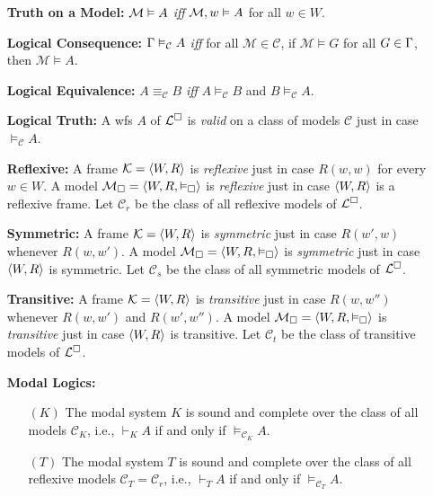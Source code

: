 \documentclass[a4paper, 11pt]{article} %
\begin{document}
\begin{enumerate}[leftmargin=1.2in] %
	\item[\bf Truth on a Model:] $\mathcal{M}\vDash A$ \textit{iff} $\mathcal{M},w\vDash A$ for all $w\in W$.
	\item[\bf Logical Consequence:] $\Gamma\vDash_\mathcal{C} A$ \textit{iff} for all $\mathcal{M}\in\mathcal{C}$, if $\mathcal{M}\vDash G$ for all $G\in\Gamma$, then $\mathcal{M}\vDash  A$.
	\item[\bf Logical Equivalence:] $A\equiv_\mathcal{C} B$ \textit{iff} $A\vDash_\mathcal{C} B$ and $B\vDash_\mathcal{C} A$.
	\item[\bf Logical Truth:] A wfs $A$ of $\mathcal{L}^{\square}$ is \textit{valid} on a class of models $\mathcal{C}$ just in case $\vDash_\mathcal{C} A$.%
	\item[\bf Reflexive:] A frame $\mathcal{K}=\langle W,R\rangle$ is \textit{reflexive} just in case $R(w,w)$ for every $w\in W$. A model $\mathcal{M}_\square=\langle W,R,\vDash_{\square}\rangle$ is \textit{reflexive} just in case $\langle W,R\rangle$ is a reflexive frame. Let $\mathcal{C}_r$ be the class of all reflexive models of $\mathcal{L}^{\square}$.
	\item[\bf Symmetric:] A frame $\mathcal{K}=\langle W,R\rangle$ is \textit{symmetric} just in case $R(w',w)$ whenever $R(w,w')$. A model $\mathcal{M}_\square=\langle W,R,\vDash_{\square}\rangle$ is \textit{symmetric} just in case $\langle W,R\rangle$ is symmetric. Let $\mathcal{C}_s$ be the class of all symmetric models of $\mathcal{L}^{\square}$.
	\item[\bf Transitive:] A frame $\mathcal{K}=\langle W,R\rangle$ is \textit{transitive} just in case $R(w,w'')$ whenever $R(w,w')$ and $R(w',w'')$. A model $\mathcal{M}_\square=\langle W,R,\vDash_{\square}\rangle$ is \textit{transitive} just in case $\langle W,R\rangle$ is transitive. Let $\mathcal{C}_t$ be the class of transitive models of $\mathcal{L}^{\square}$.
	\item[\bf Modal Logics:]
	      \begin{enumerate}
		      \item[$(K)$] The modal system $K$ is sound and complete over the class of all models $\mathcal{C}_K$, i.e., $\vdash_K A$ if and only if $\vDash_{\mathcal{C}_K} A$.
		      \item[$(T)$] The modal system $T$ is sound and complete over the class of all reflexive models $\mathcal{C}_T=\mathcal{C}_r$, i.e., $\vdash_T A$ if and only if $\vDash_{\mathcal{C}_T} A$.

\end{enumerate}
\end{enumerate}
\end{document}
